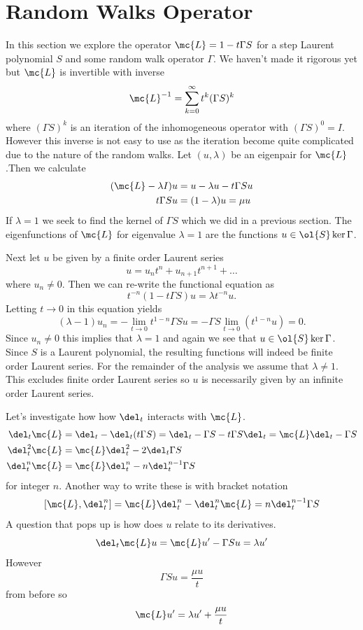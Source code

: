 \section{Random Walks Operator}
In this section we explore the operator $\mc{L} = 1 - t\Gamma S$ for a step Laurent polynomial $S$ and some random walk operator $\Gamma$. We haven't made it rigorous yet but $\mc{L}$ is invertible with inverse
\[
	\mc{L}^{-1} = \sum_{k=0}^{\infty}t^k(\Gamma S)^k
\]
where $(\Gamma S)^k$ is an iteration of the inhomogeneous operator with $(\Gamma S)^0 = I$. However this inverse is not easy to use as the iteration become quite complicated due to the nature of the random walks. Let $(u, \lambda)$ be an eigenpair for $\mc{L}$.Then we calculate
\begin{align*}
	(\mc{L}-\lambda I) u &= u - \lambda u -t\Gamma Su\\
	t \Gamma S u &= (1-\lambda)u = \mu u
\end{align*}
If $\lambda = 1$ we seek to find the kernel of $\Gamma S$ which we did in a previous section. The eigenfunctions of $\mc{L}$ for eigenvalue $\lambda = 1$ are the functions $u \in \ol{S}\ker{\Gamma}$.

Next let $u$ be given by a finite order Laurent series
\[
	u = u_n t^n + u_{n+1}t^{n+1} + \ldots
\]
where $u_n \neq 0$. Then we can re-write the functional equation as
\[
	t^{-n}(1-t\Gamma S)u = \lambda t^{-n}u.
\]
Letting $t \to 0$ in this equation yields
\[
	(\lambda - 1)u_n = -\lim_{t\to 0} t^{1-n}\Gamma S u = -\Gamma S \lim_{t\to 0} (t^{1-n} u) = 0.
\]
Since $u_n \neq 0$ this implies that $\lambda = 1$ and again we see that $u \in \ol{S}\ker \Gamma$. Since $S$ is a Laurent polynomial, the resulting functions will indeed be finite order Laurent series. For the remainder of the analysis we assume that $\lambda \neq 1$. This excludes finite order Laurent series so $u$ is necessarily given by an infinite order Laurent series.

Let's investigate how how $\del_t$ interacts with $\mc{L}$.
\begin{align*}
	\del_t \mc{L} &= \del_t - \del_t(t\Gamma S) = \del_t - \Gamma S- t\Gamma S\del_t = \mc{L}\del_t - \Gamma S\\
	\del_t^2 \mc{L} &= \mc{L}\del_t^2 - 2\del_t \Gamma S\\
	\del_t^n \mc{L} &=\mc{L} \del_t^n - n\del_t^{n-1}\Gamma S
\end{align*}
for integer $n$. Another way to write these is with bracket notation
\[
	[\mc{L},\del_t^n] = \mc{L}\del_t^n-\del_t^n\mc{L} = n\del_t^{n-1}\Gamma S
\]
A question that pops up is how does $u$ relate to its derivatives.
\[
	\del_t \mc{L} u = \mc{L}u'-\Gamma S u = \lambda u'
\]
However
\[
	\Gamma S u =\frac{\mu u}{t}
\]
from before so
\[
	\mc{L}u' = \lambda u' + \frac{\mu u}{t}
\]


\endinput
